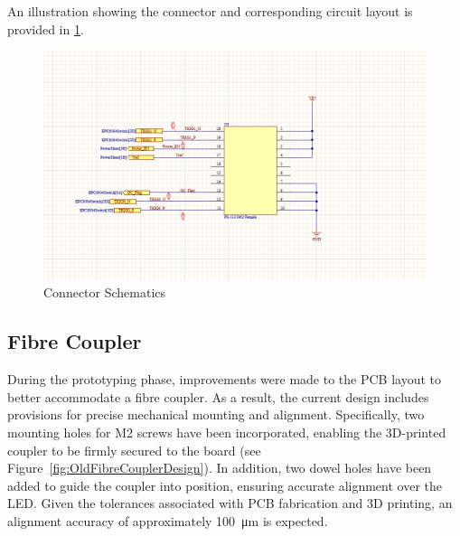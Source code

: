\documentclass[a4paper,11pt]{article}
\begin{document}
An illustration showing the connector and corresponding circuit layout is provided in \cref{fig:Connector}.

\begin{figure}[h!]
\centering
\includegraphics[scale=0.5]{Connector.png}
\caption{Connector Schematics\label{fig:Connector}}
\end{figure}


\subsection{Fibre Coupler}

During the prototyping phase, improvements were made to the PCB layout to better accommodate a fibre coupler. As a result, the current design includes provisions for precise mechanical mounting and alignment. Specifically, two mounting holes for M2 screws have been incorporated, enabling the 3D-printed coupler to be firmly secured to the board (see Figure~\ref{fig:OldFibreCouplerDesign}). In addition, two dowel holes have been added to guide the coupler into position, ensuring accurate alignment over the LED. Given the tolerances associated with PCB fabrication and 3D printing, an alignment accuracy of approximately \SI{100}{\micro\metre} is expected.
\end{document}
